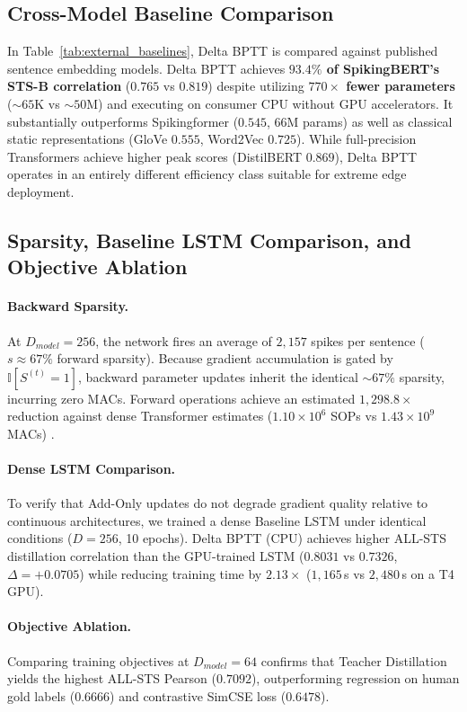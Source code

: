 \documentclass[runningheads]{llncs}
\begin{document}
\subsection{Cross-Model Baseline Comparison}
In Table~\ref{tab:external_baselines}, Delta BPTT is compared against published sentence embedding models. Delta BPTT achieves \textbf{$93.4\%$ of SpikingBERT's STS-B correlation} ($0.765$ vs $0.819$) despite utilizing \textbf{$770\times$ fewer parameters} ($\sim 65$K vs $\sim 50$M) and executing on consumer CPU without GPU accelerators. It substantially outperforms Spikingformer ($0.545$, $66$M params) as well as classical static representations (GloVe $0.555$, Word2Vec $0.725$). While full-precision Transformers achieve higher peak scores (DistilBERT $0.869$), Delta BPTT operates in an entirely different efficiency class suitable for extreme edge deployment.

\subsection{Sparsity, Baseline LSTM Comparison, and Objective Ablation}
\paragraph{Backward Sparsity.} At $D_{model}=256$, the network fires an average of $2{,}157$ spikes per sentence ($s \approx 67\%$ forward sparsity). Because gradient accumulation is gated by $\mathbb{I}[S^{(t)}=1]$, backward parameter updates inherit the identical $\sim 67\%$ sparsity, incurring zero MACs. Forward operations achieve an estimated $1{,}298.8\times$ reduction against dense Transformer estimates ($1.10 \times 10^6$ SOPs vs $1.43 \times 10^9$ MACs) \cite{horowitz2014computing}.

\paragraph{Dense LSTM Comparison.} To verify that Add-Only updates do not degrade gradient quality relative to continuous architectures, we trained a dense Baseline LSTM under identical conditions ($D=256$, 10 epochs). Delta BPTT (CPU) achieves higher ALL-STS distillation correlation than the GPU-trained LSTM ($0.8031$ vs $0.7326$, $\Delta = +0.0705$) while reducing training time by $\mathbf{2.13\times}$ ($1{,}165$\,s vs $2{,}480$\,s on a T4 GPU).

\paragraph{Objective Ablation.} Comparing training objectives at $D_{model}=64$ confirms that Teacher Distillation yields the highest ALL-STS Pearson ($0.7092$), outperforming regression on human gold labels ($0.6666$) and contrastive SimCSE loss ($0.6478$).
\end{document}
